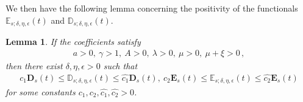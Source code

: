 \documentclass[reqno,11pt]{amsart}
\newtheorem{lemma}{Lemma}[section]
\numberwithin{equation}{section}
\begin{document}
We then have the following lemma concerning the positivity of the functionals $\mathbb{E}_{s;\delta,\eta, \epsilon}(t)$ and $\mathbb{D}_{s;\delta,\eta, \epsilon}(t)$.

\begin{lemma}\label{Lmm-Glob-ED}
    If the coefficients satisfy
\begin{equation}\label{close-eq19}
\begin{aligned}
a > 0, \ \gamma > 1, \ A > 0, \ \lambda > 0, \ \mu > 0, \ \mu + \xi > 0 \,,
\end{aligned}
\end{equation}
then there exist $\delta,\eta, \epsilon>0$ such that
\begin{equation}\label{close-eq20}
\begin{aligned}
c_1 \mathbf{D}_s (t) \leq \mathbb{D}_{s;\delta,\eta, \epsilon} (t) \leq \hat{c_1} \mathbf{D}_s (t), \ c_2 \mathbf{E}_s (t) \leq \mathbb{E}_{s;\delta,\eta, \epsilon} (t) \leq \hat{c_2} \mathbf{E}_s (t)
\end{aligned}
\end{equation}
for some constants $c_1,c_2,\hat{c_1},\hat{c_2}>0$.
\end{lemma}
\end{document}
